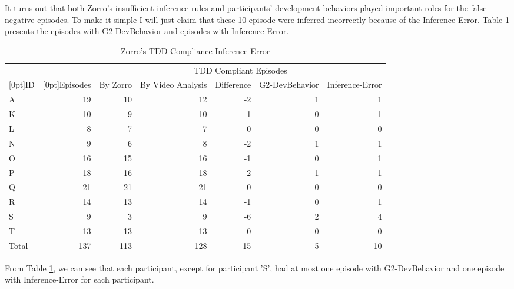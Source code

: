 It turns out that both Zorro's insufficient inference rules and 
participants' development behaviors played important roles
for the false negative episodes.  To make it simple I will just 
claim that these 10 episode were inferred incorrectly because 
of the Inference-Error. Table \ref{tab:ZorroTDDComplianceInferenceError}
presents the episodes with G2-DevBehavior and episodes with
Inference-Error.
\begin{table}[!ht]
\centering
  \begin{tabular}{|l|r|r|r|r|r|r|}
  \hline
    &  &  \multicolumn{5}{c|}{TDD Compliant Episodes} \\ \cline{3-7}
    \raisebox{1.5ex}[0pt]{ID} & \raisebox{1.5ex}[0pt]{Episodes}  & 
     By Zorro &  By Video Analysis & Difference & G2-DevBehavior & Inference-Error\\ \hline
    A       &  19   &  10    &  12  & -2  & 1  & 1 \\ \hline  
    K       &  10   &   9    &  10  & -1  & 0  & 1 \\ \hline
    L       &   8   &   7    &   7  &  0  & 0  & 0 \\ \hline  
    N       &   9   &   6    &   8  & -2  & 1  & 1 \\ \hline
    O       &  16   &  15    &  16  & -1  & 0  & 1 \\ \hline
    P       &  18   &  16    &  18  & -2  & 1  & 1 \\ \hline
    Q       &  21   &  21    &  21  &  0  & 0  & 0 \\ \hline
    R       &  14   &  13    &  14  & -1  & 0  & 1 \\ \hline
    S       &   9   &   3    &   9  & -6  & 2  & 4 \\ \hline
    T       &  13   &  13    &  13  &  0  & 0  & 0 \\ \hline
    Total   & 137   & 113    & 128  & -15 & 5  & 10 \\ \hline
    \end{tabular}
  \caption{Zorro's TDD Compliance Inference Error}
  \label{tab:ZorroTDDComplianceInferenceError} 
\end{table}
From Table \ref{tab:ZorroTDDComplianceInferenceError}, we can see that
each participant, except for participant 'S', had at most one episode
with G2-DevBehavior and one episode with Inference-Error for each
participant. 


